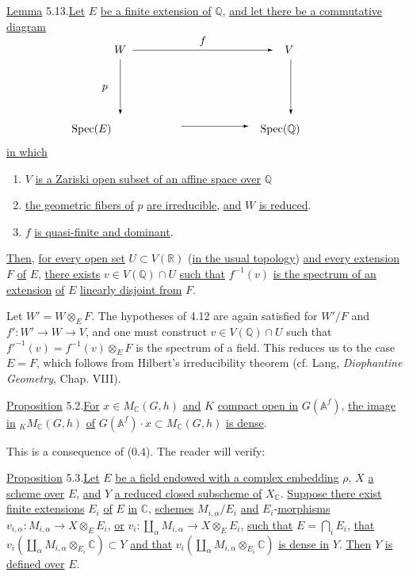 \documentclass[10pt]{article}
\newcommand{\Af}{\mathbb A^f}
\newcommand{\C}{\mathbb C}
\newcommand{\Q}{\mathbb Q}
\newcommand{\R}{\mathbb R}
\newcommand{\MC}{M_{\C}}
\newcommand{\Spec}{\operatorname{Spec}}
\begin{document}
\noindent \uline{Lemma} 5.13.\quad \uline{Let} $E$ \uline{be a finite extension of} $\Q$, \uline{and let there be a commutative diagram}
\[
\begingroup
\setlength{\unitlength}{0.55em}
\begin{picture}(58,15)
\put(14,13){\(W\)}
\put(42,13){\(V\)}
\put(7,0){\(\Spec(E)\)}
\put(38,0){\(\Spec(\Q)\)}
\put(17,13.5){\vector(1,0){23}}
\put(28,14.5){\(f\)}
\put(15,12){\vector(0,-1){9}}
\put(12,7){\(p\)}
\put(43,12){\vector(0,-1){9}}
\put(25,1){\vector(1,0){11}}
\end{picture}
\endgroup
\]
\uline{in which}
\begin{enumerate}[label=(\roman*)]
\item $V$ \uline{is a Zariski open subset of an affine space over} $\Q$
\item \uline{the geometric fibers of} $p$ \uline{are irreducible}, \uline{and} $W$ \uline{is reduced}.
\item $f$ \uline{is quasi-finite and dominant}.
\end{enumerate}
\uline{Then}, \uline{for every open set} $U\subset V(\R)$ (\uline{in the usual topology}) \uline{and every extension} $F$ \uline{of} $E$, \uline{there exists} $v\in V(\Q)\cap U$ \uline{such that} $f^{-1}(v)$ \uline{is the spectrum of an extension} \uline{of} $E$ \uline{linearly disjoint from} $F$.

Let $W'=W\otimes_EF$. The hypotheses of 4.12 are again satisfied for $W'/F$ and $f':W'\longrightarrow W\longrightarrow V$, and one must construct $v\in V(\Q)\cap U$ such that $f'^{-1}(v)=f^{-1}(v)\otimes_EF$ is the spectrum of a field. This reduces us to the case $E=F$, which follows from Hilbert's irreducibility theorem (cf. Lang, \emph{Diophantine Geometry}, Chap. VIII).

\noindent \uline{Proposition} 5.2.\quad \uline{For} $x\in\MC(G,h)$ \uline{and} $K$ \uline{compact open in} $G(\Af)$, \uline{the image} \uline{in} ${}_K\MC(G,h)$ \uline{of} $G(\Af)\cdot x\subset\MC(G,h)$ \uline{is dense}.

This is a consequence of (0.4). The reader will verify:

\noindent \uline{Proposition} 5.3.\quad \uline{Let} $E$ \uline{be a field endowed with a complex embedding} $\rho$, $X$ \uline{a scheme over} $E$, \uline{and} $Y$ \uline{a reduced closed subscheme of} $X_{\C}$. \uline{Suppose there exist} \uline{finite extensions} $E_i$ \uline{of} $E$ \uline{in} $\C$, \uline{schemes} $M_{i,\alpha}/E_i$ \uline{and} $E_i$-\uline{morphisms} $v_{i,\alpha}:M_{i,\alpha}\longrightarrow X\otimes_EE_i$, \uline{or} $v_i:\coprod_\alpha M_{i,\alpha}\longrightarrow X\otimes_EE_i$, \uline{such that} $E=\bigcap_i E_i$, \uline{that} $v_i(\coprod_\alpha M_{i,\alpha}\otimes_{E_i}\C)\subset Y$ \uline{and that} $v_i(\coprod_\alpha M_{i,\alpha}\otimes_{E_i}\C)$ \uline{is dense in} $Y$. \uline{Then} $Y$ \uline{is defined over} $E$.
\end{document}

